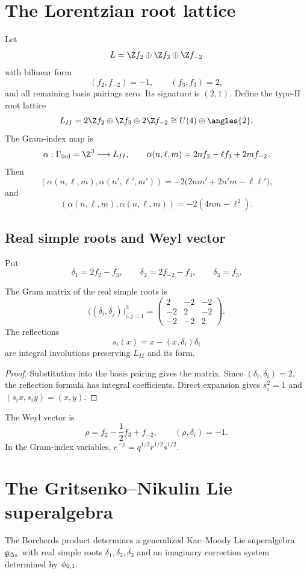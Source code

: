 \chapter{The Lorentzian root lattice}
Let
\[
 L=\Z f_2\oplus\Z f_3\oplus\Z f_{-2}
\]
with bilinear form
\[
 (f_2,f_{-2})=-1,
 \qquad (f_3,f_3)=2,
\]
and all remaining basis pairings zero. Its signature is $(2,1)$. Define the type-II root lattice
\[
 L_{II}=2\Z f_2\oplus\Z f_3\oplus2\Z f_{-2}
 \cong U(4)\oplus\angles{2}.
\]
The Gram-index map is
\[
 \alpha:\Gammaind=\Z^3\longrightarrow L_{II},
 \qquad
 \alpha(n,\ell,m)=2nf_2-\ell f_3+2mf_{-2}.
\]
Then
\[
 (\alpha(n,\ell,m),\alpha(n',\ell',m'))
 =-2\bigl(2nm'+2n'm-\ell\ell'\bigr),
\]
and
\[
 (\alpha(n,\ell,m),\alpha(n,\ell,m))
 =-2(4nm-\ell^2).
\]

\section{Real simple roots and Weyl vector}
Put
\[
 \delta_1=2f_2-f_3,
 \qquad
 \delta_2=2f_{-2}-f_3,
 \qquad
 \delta_3=f_3.
\]

\begin{proposition}
The Gram matrix of the real simple roots is
\[
 \bigl((\delta_i,\delta_j)\bigr)_{i,j=1}^3
 =\begin{pmatrix}
 2&-2&-2\\
 -2&2&-2\\
 -2&-2&2
 \end{pmatrix}.
\]
The reflections
\[
 s_i(x)=x-(x,\delta_i)\delta_i
\]
are integral involutions preserving $L_{II}$ and its form.
\end{proposition}
\begin{proof}
Substitution into the basis pairing gives the matrix. Since $(\delta_i,\delta_i)=2$, the reflection formula has integral coefficients. Direct expansion gives $s_i^2=1$ and $(s_ix,s_iy)=(x,y)$.
\end{proof}

The Weyl vector is
\[
 \rho=f_2-\frac12f_3+f_{-2},
 \qquad (\rho,\delta_i)=-1.
\]
In the Gram-index variables, $e^{-\rho}=q^{1/2}r^{1/2}s^{1/2}$.

\chapter[The denominator algebra]{The Gritsenko--Nikulin Lie superalgebra}
The Borcherds product determines a generalized Kac--Moody Lie superalgebra ${\mathfrak g_{\Delta_5}}$ with real simple roots $\delta_1,\delta_2,\delta_3$ and an imaginary correction system determined by ${\phi_{0,1}}$.

